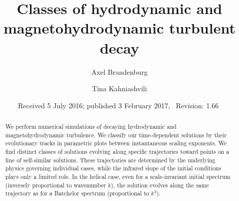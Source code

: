 \documentclass[prl,twocolumn,aps,psfig,showpacs,nofootinbib,nobibnotes,superscriptaddress,preprintnumbers,times]{revtex4}
\begin{document}
\title{Classes of hydrodynamic and magnetohydrodynamic turbulent decay}

\date{Received 5 July 2016; published 3 February 2017,~ $ $Revision: 1.66 $ $}

\author{Axel Brandenburg}

\author{Tina Kahniashvili}
 

\begin{abstract}
We perform numerical simulations of decaying hydrodynamic and
magnetohydrodynamic turbulence.
We classify our time-dependent solutions by their evolutionary tracks
in parametric plots between instantaneous scaling exponents.
We find distinct classes of solutions evolving along specific
trajectories toward points on a line of self-similar solutions.
These trajectories are determined by the underlying physics
governing individual cases, while the infrared slope of the
initial conditions plays only a limited role.
In the helical case, even for a scale-invariant initial spectrum
(inversely proportional to wavenumber $k$), the solution evolves
along the same trajectory as for a Batchelor spectrum
(proportional to $k^4$).
\end{abstract}

\maketitle
\end{document}
